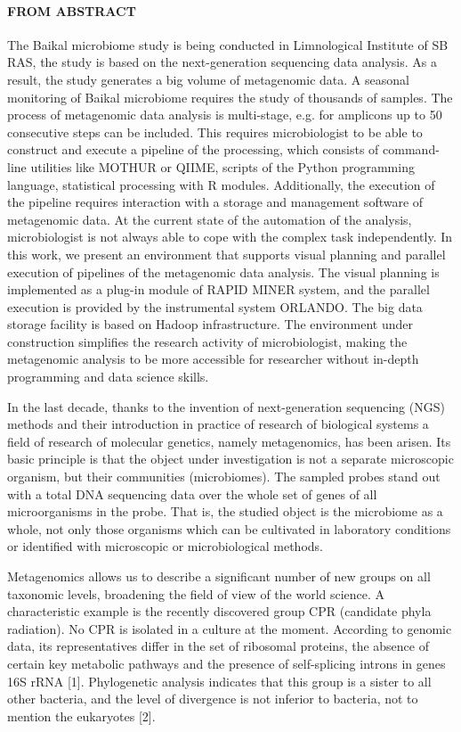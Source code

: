 \documentclass[conference,a4paper]{IEEEtran}
\begin{document}
\paragraph{FROM ABSTRACT}

The Baikal microbiome study is being conducted in Limnological Institute of SB RAS, the study is based on the next-generation sequencing data analysis. As a result, the study generates a big volume of metagenomic data. A seasonal monitoring of Baikal microbiome requires the study of thousands of samples. The process of metagenomic data analysis is multi-stage, e.g. for amplicons up to 50 consecutive steps can be included. This requires microbiologist to be able to construct and execute a pipeline of the processing, which consists of command-line utilities like MOTHUR or QIIME, scripts of the Python programming language, statistical processing with R modules. Additionally, the execution of the pipeline requires interaction with a storage and management software of metagenomic data. At the current state of the automation of the analysis, microbiologist is not always able to cope with the complex task independently. In this work, we present an environment that supports visual planning and parallel execution of pipelines of the metagenomic data analysis. The visual planning is implemented as a plug-in module of RAPID MINER system, and the parallel execution is provided by the instrumental system ORLANDO. The big data storage facility is based on Hadoop infrastructure. The environment under construction simplifies the research activity of microbiologist, making the metagenomic analysis to be more accessible for researcher without in-depth programming and data science skills.


In the last decade, thanks to the invention of next-generation sequencing (NGS) methods and their introduction in practice of research of biological systems a field of research of molecular genetics, namely metagenomics, has been arisen. Its basic principle is that the object under investigation is not a separate microscopic organism, but their communities (microbiomes). The sampled probes stand out with a total DNA sequencing data over the whole set of genes of all microorganisms in the probe. That is, the studied object is the microbiome as a whole, not only those organisms which can be cultivated in laboratory conditions or identified with microscopic or microbiological methods.

Metagenomics allows us to describe a significant number of new groups on all taxonomic levels, broadening the field of view of the world science. A characteristic example is the recently discovered group CPR (candidate phyla radiation). No CPR is isolated in a culture at the moment. According to genomic data, its representatives differ in the set of ribosomal proteins, the absence of certain key metabolic pathways and the presence of self-splicing introns in genes 16S rRNA [1]. Phylogenetic analysis indicates that this group is a sister to all other bacteria, and the level of divergence is not inferior to bacteria, not to mention the eukaryotes [2].
\end{document}

